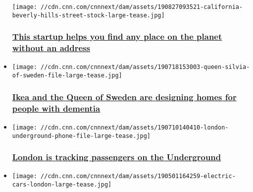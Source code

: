 \begin{itemize}
  \texttt{[image: //cdn.cnn.com/cnnnext/dam/assets/190827093521-california-beverly-hills-street-stock-large-tease.jpg]}

  \hypertarget{this-startup-helps-you-find-any-place-on-the-planet-without-an-address}{%
  \subsubsection{\texorpdfstring{\href{/2019/08/27/tech/what3words-app-w3w-address-startup/index.html}{This
  startup helps you find any place on the planet without an
  address}}{This startup helps you find any place on the planet without an address}}\label{this-startup-helps-you-find-any-place-on-the-planet-without-an-address}}
\item
  \href{/2019/08/08/business/ikea-sweden-dementia/index.html}{}

  \texttt{[image: //cdn.cnn.com/cnnnext/dam/assets/190718153003-queen-silvia-of-sweden-file-large-tease.jpg]}

  \hypertarget{ikea-and-the-queen-of-sweden-are-designing-homes-for-people-with-dementia}{%
  \subsubsection{\texorpdfstring{\href{/2019/08/08/business/ikea-sweden-dementia/index.html}{Ikea
  and the Queen of Sweden are designing homes for people with
  dementia}}{Ikea and the Queen of Sweden are designing homes for people with dementia}}\label{ikea-and-the-queen-of-sweden-are-designing-homes-for-people-with-dementia}}
\item
  \href{/2019/07/12/tech/london-subway-tracking/index.html}{}

  \texttt{[image: //cdn.cnn.com/cnnnext/dam/assets/190710140410-london-underground-phone-file-large-tease.jpg]}

  \hypertarget{london-is-tracking-passengers-on-the-underground-}{%
  \subsubsection{\texorpdfstring{\href{/2019/07/12/tech/london-subway-tracking/index.html}{London
  is tracking passengers on the Underground
  }}{London is tracking passengers on the Underground }}\label{london-is-tracking-passengers-on-the-underground-}}
\item
  \href{/videos/business/2019/07/02/innovative-cities-london-air-pollution-foster-pkg.cnn}{}

  \texttt{[image: //cdn.cnn.com/cnnnext/dam/assets/190501164259-electric-cars-london-large-tease.jpg]}


\end{itemize}
